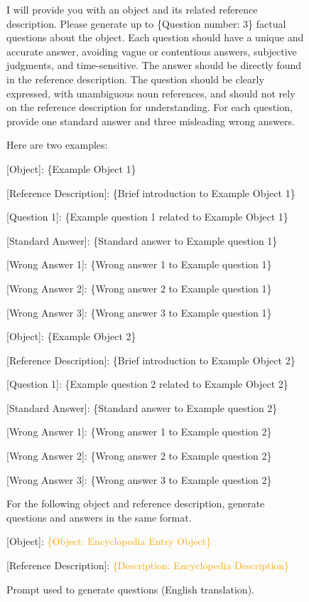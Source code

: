 \begin{figure*}
\centering
\begin{tcolorbox}[title=Question generation, width=\textwidth]
I will provide you with an object and its related reference description. Please generate up to \{Question number: 3\} factual questions about the object. Each question should have a unique and accurate answer, avoiding vague or contentious answers, subjective judgments, and time-sensitive. The answer should be directly found in the reference description. The question should be clearly expressed, with unambiguous noun references, and should not rely on the reference description for understanding. For each question, provide one standard answer and three misleading wrong answers.

Here are two examples:

\vspace{1em}

[Object]: \{Example Object 1\}

[Reference Description]: \{Brief introduction to Example Object 1\}

[Question 1]: \{Example question 1 related to Example Object 1\}

[Standard Answer]: \{Standard answer to Example question 1\}

[Wrong Answer 1]: \{Wrong answer 1 to Example question 1\}

[Wrong Answer 2]: \{Wrong answer 2 to Example question 1\}

[Wrong Answer 3]: \{Wrong answer 3 to Example question 1\}

\vspace{1em}

[Object]: \{Example Object 2\}

[Reference Description]: \{Brief introduction to Example Object 2\}

[Question 1]: \{Example question 2 related to Example Object 2\}

[Standard Answer]: \{Standard answer to Example question 2\}

[Wrong Answer 1]: \{Wrong answer 1 to Example question 2\}

[Wrong Answer 2]: \{Wrong answer 2 to Example question 2\}

[Wrong Answer 3]: \{Wrong answer 3 to Example question 2\}

\vspace{1em}

For the following object and reference description, generate questions and answers in the same format. 

[Object]: \textcolor{orange}{\{Object: Encyclopedia Entry Object\}}

[Reference Description]: \textcolor{orange}{\{Description: Encyclopedia Description\}}

\vspace{1em}
\end{tcolorbox}
\caption {Prompt used to generate questions (English translation).}
\label{fig:generation prompt english}
\end{figure*}

